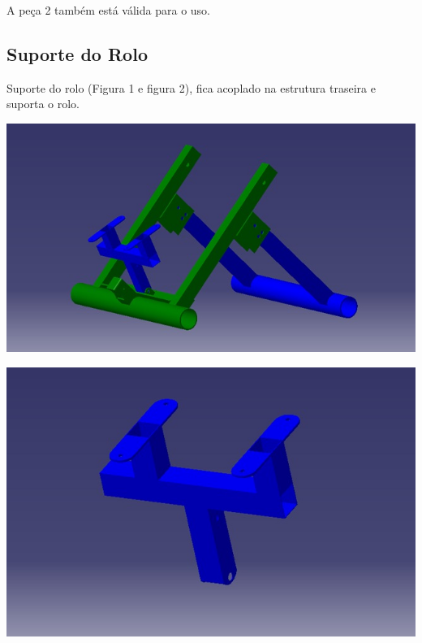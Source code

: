 A peça 2 também está válida para o uso.

\subsection{Suporte do Rolo}

Suporte do rolo (Figura 1 e figura 2), fica acoplado na estrutura traseira e suporta o rolo.
 
    \begin{center}
    	\includegraphics[scale=0.7]{figuras/esq_suporte_rolo_1}
        \label{esq_suporte_rolo_1}
    \end{center} 

 
    \begin{center}
    	\includegraphics[scale=0.7]{figuras/esq_suporte_rolo_2}
        \label{esq_suporte_rolo_2}
    \end{center} 
 
